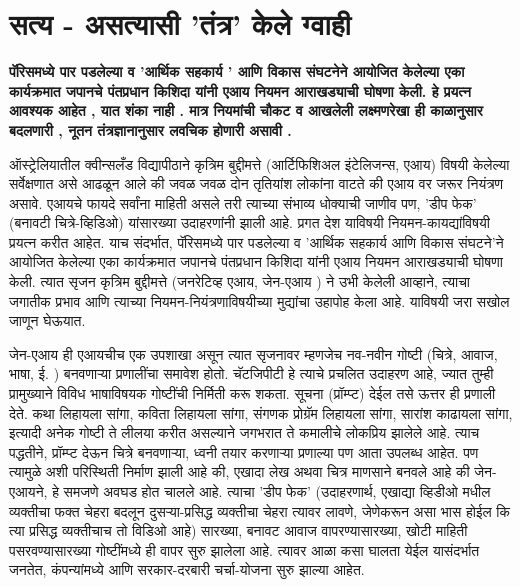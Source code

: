 \chapter{सत्य - असत्यासी 'तंत्र' केले ग्वाही}

{\textbf{पॅरिसमध्ये पार पडलेल्या व 'आर्थिक सहकार्य '  आणि विकास संघटनेने आयोजित केलेल्या एका कार्यक्रमात जपानचे पंतप्रधान किशिदा यांनी एआय नियमन आराखड्याची घोषणा केली. हे प्रयत्न आवश्यक आहेत ,  यात शंका नाही .  मात्र नियमांची चौकट व आखलेली लक्ष्मणरेखा ही काळानुसार बदलणारी , नूतन तंत्रज्ञानानुसार लवचिक होणारी असावी . }}

\vspace{1.5em}

ऑस्ट्रेलियातील क्वीन्सलँड विद्यापीठाने कृत्रिम बुद्दीमत्ते (आर्टिफिशिअल इंटेलिजन्स, एआय) विषयी केलेल्या सर्वेक्षणात असे आढळून आले की जवळ जवळ दोन तृतियांश लोकांना वाटते की एआय वर जरूर नियंत्रण असावे. एआयचे फायदे सर्वांना माहिती असले तरी त्याच्या संभाव्य धोक्याची जाणीव पण, 'डीप फेक' (बनावटी चित्रे-व्हिडिओ) यांसारख्या उदाहरणांनी झाली आहे. प्रगत देश याविषयी नियमन-कायद्यांविषयी प्रयत्न करीत आहेत. याच संदर्भात, पॅरिसमध्ये पार पडलेल्या व 'आर्थिक सहकार्य आणि विकास संघटने'ने आयोजित केलेल्या एका कार्यक्रमात जपानचे पंतप्रधान किशिदा यांनी एआय नियमन आराखड्याची घोषणा केली. त्यात सृजन कृत्रिम बुद्दीमत्ते (जनरेटिव्ह एआय, जेन-एआय ) ने उभी केलेली आव्हाने, त्याचा जगातीक प्रभाव आणि त्याच्या नियमन-नियंत्रणाविषयीच्या मुद्यांचा उहापोह केला आहे. याविषयी जरा सखोल जाणून घेऊयात.

जेन-एआय ही एआयचीच एक उपशाखा असून त्यात सृजनावर म्हणजेच नव-नवीन गोष्टी (चित्रे, आवाज, भाषा, ई. ) बनवणाऱ्या प्रणालींचा समावेश होतो. चॅटजिपीटी हे त्याचे प्रचलित उदाहरण आहे, ज्यात तुम्ही प्रामुख्याने विविध भाषाविषयक गोष्टींची निर्मिती करू शकता. सूचना (प्रॉम्प्ट) देईल तसे ऊत्तर ही प्रणाली देते. कथा लिहायला सांगा, कविता लिहायला सांगा, संगणक प्रोग्रॅम लिहायला सांगा, सारांश काढायला सांगा, इत्यादी अनेक गोष्टी ते लीलया करीत असल्याने जगभरात ते कमालीचे लोकप्रिय झालेले आहे. त्याच पद्धतीने, प्रॉम्प्ट देऊन चित्रे बनवणाऱ्या, ध्वनी तयार करणाऱ्या प्रणाल्या पण आता उपलब्ध आहेत. पण त्यामुळे अशी परिस्थिती निर्माण झाली आहे की, एखादा लेख अथवा चित्र माणसाने बनवले आहे की जेन-एआयने, हे समजणे अवघड होत चालले आहे. त्याचा 'डीप फेक' (उदाहरणार्थ, एखाद्या व्हिडीओ मधील व्यक्तीचा फक्त चेहरा बदलून दुसऱ्या-प्रसिद्ध व्यक्तीचा चेहरा त्यावर लावणे, जेणेकरून असा भास होईल कि त्या प्रसिद्ध व्यक्तीचाच तो विडिओ आहे) सारख्या, बनावट आवाज वापरण्यासारख्या, खोटी माहिती पसरवण्यासारख्या गोष्टींमध्ये ही वापर सुरु झालेला आहे. त्यावर आळा कसा घालता येईल यासंदर्भात जनतेत, कंपन्यांमध्ये आणि सरकार-दरबारी चर्चा-योजना सुरु झाल्या आहेत.

